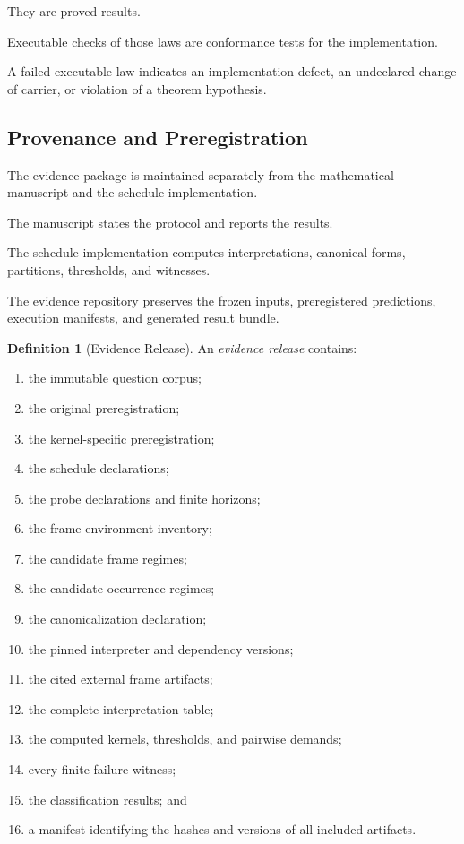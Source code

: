 \documentclass[11pt]{article}
\theoremstyle{plain}
\theoremstyle{definition}
\newtheorem{definition}[theorem]{Definition}
\theoremstyle{remark}
\begin{document}
They are proved results.

Executable checks of those laws
are conformance tests
for the implementation.

A failed executable law
indicates an implementation defect,
an undeclared change of carrier,
or violation of a theorem hypothesis.

\subsection{Provenance and Preregistration}

The evidence package is maintained
separately from the mathematical manuscript
and the schedule implementation.

The manuscript states the protocol and reports the results.

The schedule implementation computes
interpretations,
canonical forms,
partitions,
thresholds,
and witnesses.

The evidence repository preserves
the frozen inputs,
preregistered predictions,
execution manifests,
and generated result bundle.

\begin{definition}[Evidence Release]
  \label{ik.def.evidence-release}
  An \emph{evidence release}
  contains:
  \begin{enumerate}[label=(\alph*)]
    \item the immutable question corpus;
    \item the original preregistration;
    \item the kernel-specific preregistration;
    \item the schedule declarations;
    \item the probe declarations
          and finite horizons;
    \item the frame-environment inventory;
    \item the candidate frame regimes;
    \item the candidate occurrence regimes;
    \item the canonicalization declaration;
    \item the pinned interpreter
          and dependency versions;
    \item the cited external frame artifacts;
    \item the complete interpretation table;
    \item the computed kernels,
          thresholds,
          and pairwise demands;
    \item every finite failure witness;
    \item the classification results; and
    \item a manifest identifying
          the hashes and versions
          of all included artifacts.
  \end{enumerate}
\end{definition}
\end{document}
